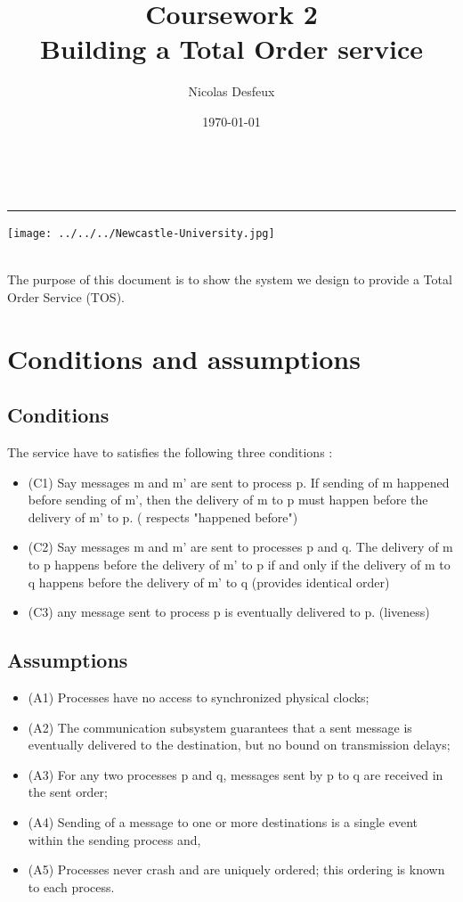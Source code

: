 \documentclass[a4paper,11pt]{article} %
\date{\today}
\author{Nicolas Desfeux}
\title{
{Coursework 2\\Building a Total Order service
}}
\makeatletter
\def\maketitle{

	\begin{multicols}{2}
		{\begin{center}
		{\LARGE \@title}\\
		\rule{3cm}{1pt}
	\end{center}}
		\begin{flushright}
			{\texttt{[image: ../../../Newcastle-University.jpg]}}\\
			{\@date}\\
		\end{flushright}
	\end{multicols}	
	\vspace{1cm}
}
\makeatother
\begin{document}
\maketitle
{}
The purpose of this document is to show the system we design to provide a Total Order Service (TOS).
\section{Conditions and assumptions}
\subsection{Conditions}
The service have to satisfies the following three conditions : 
\begin{itemize}
\item (C1) Say messages m and m' are sent to process p. If sending of
m happened before sending of m', then the delivery of m to p
must happen before the delivery of m' to p.
( respects "happened before")
\item (C2) Say messages m and m' are sent to processes p and q. The
delivery of m to p happens before the delivery of m' to p if and
only if the delivery of m to q happens before the delivery of m'
to q (provides identical order)
\item (C3) any message sent to process p is eventually delivered to p.
(liveness)
\end{itemize}
\subsection{Assumptions}
\begin{itemize}
\item (A1) Processes have no access to synchronized physical clocks;
\item (A2) The communication subsystem guarantees that a sent
message is eventually delivered to the destination, but no bound
on transmission delays;
\item (A3) For any two processes p and q, messages sent by p to q are
received in the sent order;
\item (A4) Sending of a message to one or more destinations is a single
event within the sending process and,
\item (A5) Processes never crash and are uniquely ordered; this
ordering is known to each process.
\end{itemize}
\end{document}
